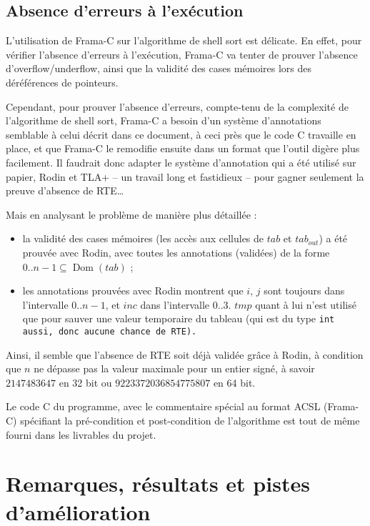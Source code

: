 \documentclass[a4paper, 11pt]{article}
\DeclareMathOperator{\ddom}{Dom}
\newcommand{\dom}[1]{\ddom\left(#1\right)}
\theoremstyle{mystyle}
\begin{document}
\subsection{Absence d'erreurs à l'exécution}

L'utilisation de Frama-C sur l'algorithme de shell sort est délicate. En effet, pour vérifier l'absence d'erreurs à l'exécution, Frama-C va tenter de prouver l'absence d'overflow/underflow, ainsi que la validité des cases mémoires lors des déréférences de pointeurs.

Cependant, pour prouver l'absence d'erreurs, compte-tenu de la complexité de l'algorithme de shell sort, Frama-C a besoin d'un système d'annotations semblable à celui décrit dans ce document, à ceci près que le code C travaille en place, et que Frama-C le remodifie ensuite dans un format que l'outil digère plus facilement. Il faudrait donc adapter le système d'annotation qui a été utilisé sur papier, Rodin et TLA+ -- un travail long et fastidieux -- pour gagner seulement la preuve d'absence de RTE\ldots{}

Mais en analysant le problème de manière plus détaillée :
\begin{itemize}
    \item la validité des cases mémoires (les accès aux cellules de $tab$ et $tab_{out}$) a été prouvée avec Rodin, avec toutes les annotations (validées) de la forme $0..n - 1 \subseteq \dom{tab}$ ;
    \item les annotations prouvées avec Rodin montrent que $i$, $j$ sont toujours dans l'intervalle $0..n - 1$, et $inc$ dans l'intervalle $0..3$. $tmp$ quant à lui n'est utilisé que pour sauver une valeur temporaire du tableau (qui est du type \tt{int} aussi, donc aucune chance de RTE).
\end{itemize}
Ainsi, il semble que l'absence de RTE soit déjà validée grâce à Rodin, à condition que $n$ ne dépasse pas la valeur maximale pour un entier signé, à savoir $2147483647$ en 32 bit ou $9223372036854775807$ en 64 bit.

Le code C du programme, avec le commentaire spécial au format ACSL (Frama-C) spécifiant la pré-condition et post-condition de l'algorithme est tout de même fourni dans les livrables du projet.

\clearpage\section{Remarques, résultats et pistes d'amélioration}
\end{document}
